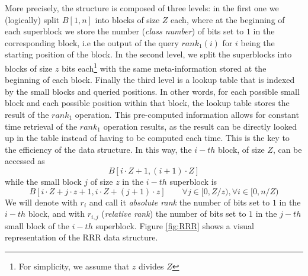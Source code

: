 \noindent More precisely, the structure is composed of three levels: in the first one we (logically) split $B[1, n]$ into blocks of size $Z$ each, where at the beginning of each superblock we store the number (\emph{class number}) of bits set to $1$ in the corresponding block, i.e the output of the query $rank_1(i)$ for $i$ being the starting position of the block. In the second level, we split the superblocks into blocks of size $z$ bits each\footnote{For simplicity, we assume that $z$ divides $Z$} with the same meta-information stored at the beginning of each block. Finally the third level is a lookup table that is indexed by the small blocks and queried positions. In other words, for each possible small block and each possible position within that block, the lookup table stores the result of the $rank_1$ operation. This pre-computed information allows for constant time retrieval of the $rank_1$ operation results, as the result can be directly looked up in the table instead of having to be computed each time. This is the key to the efficiency of the data structure. In this way, the $i-th$ block, of size $Z$, can be accessed as
\[
    B[i \cdot Z + 1, (i+1) \cdot Z]
\]
while the small block $j$ of size $z$ in the $i-th$ superblock is
\[
    B[i \cdot Z + j \cdot z + 1, i \cdot Z + (j+1) \cdot z] \qquad \forall j \in [0, Z/z), \forall i \in [0, n/Z)
\]
We will denote with $r_i$ and call it \emph{absolute rank} the number of bits set to $1$ in the $i-th$ block, and with $r_{i,j}$ (\emph{relative rank}) the number of bits set to $1$ in the $j-th$ small block of the $i-th$ superblock. Figure \ref{fig:RRR} shows a visual representation of the RRR data structure.

